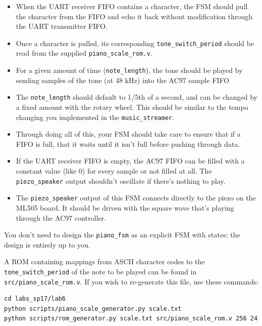 \documentclass[11pt]{article}
\begin{document}
\begin{itemize}
	\item When the UART receiver FIFO contains a character, the FSM should pull the character from the FIFO and echo it back without modification through the UART transmitter FIFO.
	
	\item Once a character is pulled, its corresponding \verb|tone_switch_period| should be read from the supplied \verb|piano_scale_rom.v|.
	
	\item For a given amount of time (\verb|note_length|), the tone should be played by sending samples of the tone (at 48 kHz) into the AC97 sample FIFO
	
	\item The \verb|note_length| should default to 1/5th of a second, and can be changed by a fixed amount with the rotary wheel. This should be similar to the tempo changing you implemented in the \verb|music_streamer|.
	
	\item Through doing all of this, your FSM should take care to ensure that if a FIFO is full, that it waits until it isn't full before pushing through data.
	
	\item If the UART receiver FIFO is empty, the AC97 FIFO can be filled with a constant value (like 0) for every sample or not filled at all. The \verb|piezo_speaker| output shouldn't oscillate if there's nothing to play.
	
	\item The \verb|piezo_speaker| output of this FSM connects directly to the piezo on the ML505 board. It should be driven with the square wave that's playing through the AC97 controller.
\end{itemize}

You don't need to design the \verb|piano_fsm| as an explicit FSM with states; the design is entirely up to you.

A ROM containing mappings from ASCII character codes to the \verb|tone_switch_period| of the note to be played can be found in \verb|src/piano_scale_rom.v|. If you wish to re-generate this file, use these commands:

\begin{verbatim}
cd labs_sp17/lab6
python scripts/piano_scale_generator.py scale.txt
python scripts/rom_generator.py scale.txt src/piano_scale_rom.v 256 24
\end{verbatim}
\end{document}
